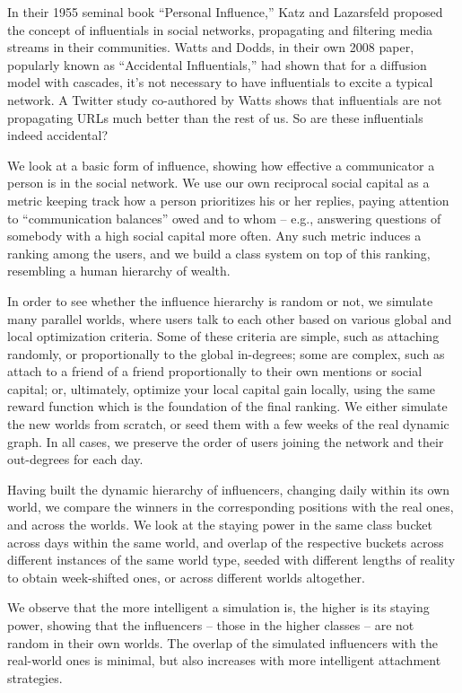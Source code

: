 \documentclass[10pt,oneside]{memoir}
\begin{document}
In their 1955 seminal book ``Personal Influence,'' Katz and Lazarsfeld \cite{katz1955influence} proposed the concept of influentials in social networks, propagating and filtering media streams in their communities.  Watts and Dodds, in their own 2008 paper, popularly known as ``Accidental Influentials,'' had shown that for a diffusion model with cascades, it's not necessary to have influentials to excite a typical network.  A Twitter study co-authored by Watts shows that influentials are not propagating URLs much better than the rest of us.  So are these influentials indeed accidental?


We look at a basic form of influence, showing how effective a communicator a person is in the social network.  We use our own reciprocal social capital as a metric keeping track how a person prioritizes his or her replies, paying attention to ``communication balances'' owed and to whom -- e.g., answering questions of somebody with a high social capital more often.  Any such metric induces a ranking among the users, and we build a class system on top of this ranking, resembling a human hierarchy of wealth.


In order to see whether the influence hierarchy is random or not, we simulate many parallel worlds, where users talk to each other based on various global and local optimization criteria.  Some of these criteria are simple, such as attaching randomly, or proportionally to the global in-degrees; some are complex, such as attach to a friend of a friend proportionally to their own mentions or social capital; or, ultimately, optimize your local capital gain locally, using the same reward function which is the foundation of the final ranking.  We either simulate the new worlds from scratch, or seed them with a few weeks of the real dynamic graph.  In all cases, we preserve the order of users joining the network and their out-degrees for each day.


Having built the dynamic hierarchy of influencers, changing daily within its own world, we compare the winners in the corresponding positions with the real ones, and across the worlds.  We look at the staying power in the same class bucket across days within the same world, and overlap of the respective buckets across different instances of the same world type, seeded with different lengths of reality to obtain week-shifted ones, or across different worlds altogether.


We observe that the more intelligent a simulation is, the higher is its staying power, showing that the influencers -- those in the higher classes -- are not random in their own worlds.  The overlap of the simulated influencers with the real-world ones is minimal, but also increases with more intelligent attachment strategies.
\end{document}
